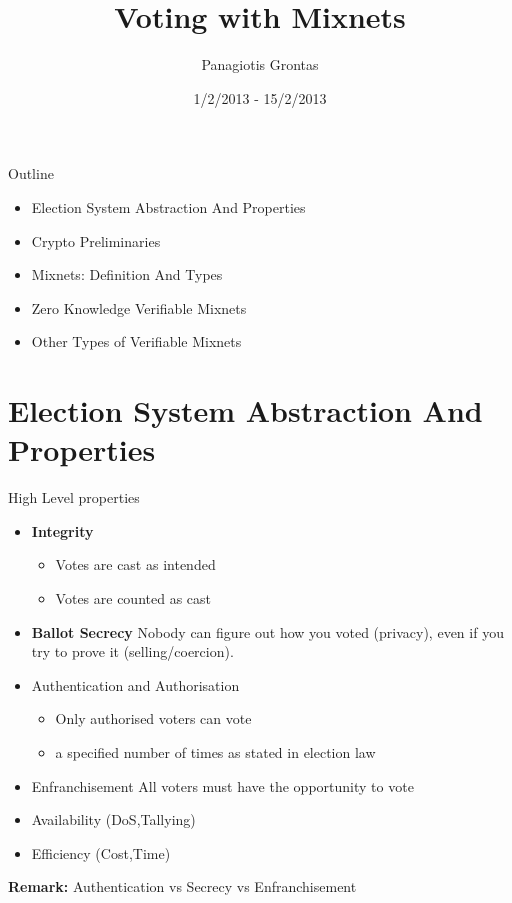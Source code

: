 \documentclass{beamer}
\title{Voting with Mixnets}
\author{Panagiotis Grontas}
\date{1/2/2013 - 15/2/2013}
\institute{$\mu\Pi\lambda\forall$  - CoReLab Crypto Group}
\begin{document}
\begin{frame}
\titlepage
\end{frame}

\begin{frame}{Outline}
\begin{itemize}
\item Election System Abstraction And Properties
\item Crypto Preliminaries
\item Mixnets: Definition And Types
\item Zero Knowledge Verifiable Mixnets
\item Other Types of Verifiable Mixnets
\end{itemize}
\end{frame}

\section{Election System Abstraction And Properties}

\begin{frame}{High Level properties \cite{JAH12}}
\begin{itemize}
\item \textbf{Integrity}
\begin{itemize}
	\item Votes are cast as intended
	\item Votes are counted as cast
\end{itemize}
\item \textbf{Ballot Secrecy} Nobody can figure out how you voted (privacy), even if you try to prove it (selling/coercion).
\item Authentication and Authorisation
\begin{itemize}
	\item Only authorised voters can vote
	\item a specified number of times as stated in election law
\end{itemize}
\item Enfranchisement All voters must have the opportunity to vote
\item Availability (DoS,Tallying)
\item Efficiency (Cost,Time)
\end{itemize}
\textbf{Remark:} Authentication vs Secrecy vs Enfranchisement
\end{frame}
 
\end{document}
